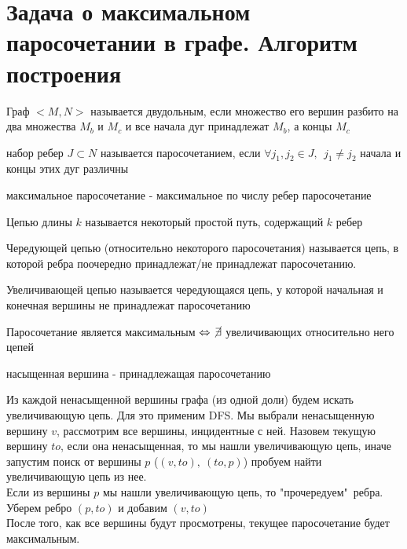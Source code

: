 \documentclass[discrete.tex]{subfiles}
\begin{document}
\section{Задача о максимальном паросочетании в графе. Алгоритм построения}

\begin{definition}
    Граф $<M, N>$ называется двудольным, если множество его вершин разбито на два
    множества $M_b$ и $M_c$ и все начала дуг принадлежат $M_b$, а концы $M_c$
\end{definition}

\begin{definition}
    набор ребер $J \subset N$ называется паросочетанием, если $\forall j_1, j_2 \in J,\ \
    j_1 \neq j_2$ начала и концы этих дуг различны
\end{definition}

\begin{definition}
    максимальное паросочетание - максимальное по числу ребер паросочетание
\end{definition}

\begin{definition}
    Цепью длины $k$ называется некоторый простой путь, содержащий $k$ ребер
\end{definition}

\begin{definition}
    Чередующей цепью (относительно некоторого паросочетания) называется цепь,
    в которой ребра поочередно принадлежат/не принадлежат паросочетанию.
\end{definition}

\begin{definition}
    Увеличивающей цепью называется чередующаяся цепь, у которой начальная и конечная
    вершины не принадлежат паросочетанию
\end{definition}

\begin{theorem}[Бержа]
    Паросочетание является максимальным $\Leftrightarrow$ $\cancel{\exists }$ увеличивающих
    относительно него цепей
\end{theorem}

\begin{definition}
    насыщенная вершина - принадлежащая паросочетанию
\end{definition}

\begin{definition}
    Из каждой ненасыщенной вершины графа (из одной доли) будем искать увеличивающую цепь.
    Для это применим DFS. Мы выбрали ненасыщенную вершину $v$, рассмотрим все вершины,
    инцидентные с ней. Назовем текущую вершину $to$, если она ненасыщенная, то мы
    нашли увеличивающую цепь, иначе запустим поиск от вершины $p$ ($(v, to), \ (to, p)$)
    пробуем найти увеличивающую цепь из нее.\\
    Если из вершины $p$ мы нашли увеличивающую цепь, то "прочередуем"\ ребра. Уберем
    ребро $(p, to)$ и добавим $(v, to)$\\
    После того, как все вершины будут просмотрены, текущее паросочетание будет
    максимальным.
\end{definition}
\end{document}
